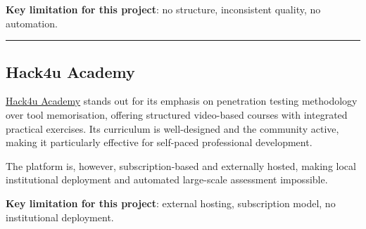 \textbf{Key limitation for this project}: no structure, inconsistent quality, no automation.

\begin{center}\rule{0.5\linewidth}{0.5pt}\end{center}

\subsection{Hack4u Academy}

\href{https://hack4u.io/}{Hack4u Academy} stands out for its emphasis on penetration testing methodology over tool memorisation, offering structured video-based courses with integrated practical exercises. Its curriculum is well-designed and the community active, making it particularly effective for self-paced professional development.

The platform is, however, subscription-based and externally hosted, making local institutional deployment and automated large-scale assessment impossible.

\textbf{Key limitation for this project}: external hosting, subscription model, no institutional deployment.
